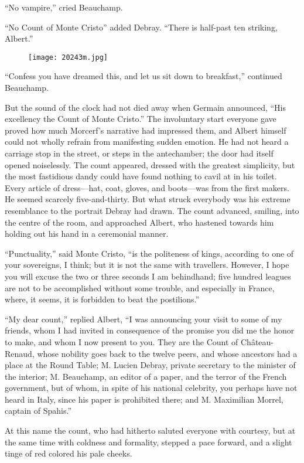 “No vampire,” cried Beauchamp.

“No Count of Monte Cristo” added Debray. “There is half-past ten
striking, Albert.”

\begin{figure}[h]
\texttt{[image: 20243m.jpg]}
\end{figure}

“Confess you have dreamed this, and let us sit down to breakfast,”
continued Beauchamp.

But the sound of the clock had not died away when Germain announced,
“His excellency the Count of Monte Cristo.” The involuntary start
everyone gave proved how much Morcerf’s narrative had impressed them,
and Albert himself could not wholly refrain from manifesting sudden
emotion. He had not heard a carriage stop in the street, or steps in
the antechamber; the door had itself opened noiselessly. The count
appeared, dressed with the greatest simplicity, but the most fastidious
dandy could have found nothing to cavil at in his toilet. Every article
of dress—hat, coat, gloves, and boots—was from the first makers. He
seemed scarcely five-and-thirty. But what struck everybody was his
extreme resemblance to the portrait Debray had drawn. The count
advanced, smiling, into the centre of the room, and approached Albert,
who hastened towards him holding out his hand in a ceremonial manner.

“Punctuality,” said Monte Cristo, “is the politeness of kings,
according to one of your sovereigns, I think; but it is not the same
with travellers. However, I hope you will excuse the two or three
seconds I am behindhand; five hundred leagues are not to be
accomplished without some trouble, and especially in France, where, it
seems, it is forbidden to beat the postilions.”

“My dear count,” replied Albert, “I was announcing your visit to some
of my friends, whom I had invited in consequence of the promise you did
me the honor to make, and whom I now present to you. They are the Count
of Château-Renaud, whose nobility goes back to the twelve peers, and
whose ancestors had a place at the Round Table; M. Lucien Debray,
private secretary to the minister of the interior; M. Beauchamp, an
editor of a paper, and the terror of the French government, but of
whom, in spite of his national celebrity, you perhaps have not heard in
Italy, since his paper is prohibited there; and M. Maximilian Morrel,
captain of Spahis.”

At this name the count, who had hitherto saluted everyone with
courtesy, but at the same time with coldness and formality, stepped a
pace forward, and a slight tinge of red colored his pale cheeks.

